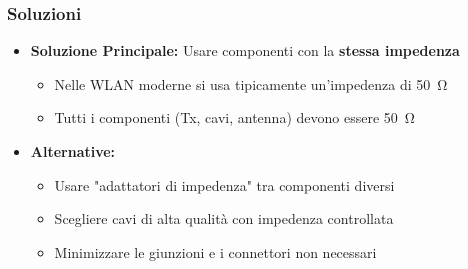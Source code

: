 \subsubsection{Soluzioni}
\begin{itemize}
    \item \textbf{Soluzione Principale:} Usare componenti con la \textbf{stessa impedenza}
    \begin{itemize}
        \item Nelle WLAN moderne si usa tipicamente un'impedenza di \SI{50}{\ohm}
        \item Tutti i componenti (Tx, cavi, antenna) devono essere \SI{50}{\ohm}
    \end{itemize}
    \item \textbf{Alternative:}
    \begin{itemize}
        \item Usare "adattatori di impedenza" tra componenti diversi
        \item Scegliere cavi di alta qualità con impedenza controllata
        \item Minimizzare le giunzioni e i connettori non necessari
    \end{itemize}
\end{itemize}

